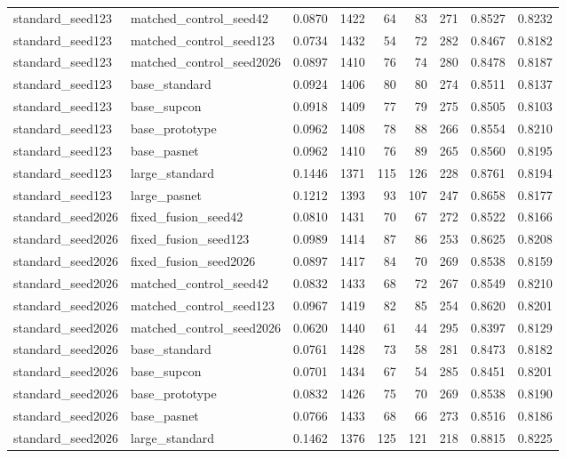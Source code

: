 \begin{tabular}{llrrrrrrr}
standard\_seed123 & matched\_control\_seed42 & 0.0870 & 1422 & 64 & 83 & 271 & 0.8527 & 0.8232 \\
standard\_seed123 & matched\_control\_seed123 & 0.0734 & 1432 & 54 & 72 & 282 & 0.8467 & 0.8182 \\
standard\_seed123 & matched\_control\_seed2026 & 0.0897 & 1410 & 76 & 74 & 280 & 0.8478 & 0.8187 \\
standard\_seed123 & base\_standard & 0.0924 & 1406 & 80 & 80 & 274 & 0.8511 & 0.8137 \\
standard\_seed123 & base\_supcon & 0.0918 & 1409 & 77 & 79 & 275 & 0.8505 & 0.8103 \\
standard\_seed123 & base\_prototype & 0.0962 & 1408 & 78 & 88 & 266 & 0.8554 & 0.8210 \\
standard\_seed123 & base\_pasnet & 0.0962 & 1410 & 76 & 89 & 265 & 0.8560 & 0.8195 \\
standard\_seed123 & large\_standard & 0.1446 & 1371 & 115 & 126 & 228 & 0.8761 & 0.8194 \\
standard\_seed123 & large\_pasnet & 0.1212 & 1393 & 93 & 107 & 247 & 0.8658 & 0.8177 \\
standard\_seed2026 & fixed\_fusion\_seed42 & 0.0810 & 1431 & 70 & 67 & 272 & 0.8522 & 0.8166 \\
standard\_seed2026 & fixed\_fusion\_seed123 & 0.0989 & 1414 & 87 & 86 & 253 & 0.8625 & 0.8208 \\
standard\_seed2026 & fixed\_fusion\_seed2026 & 0.0897 & 1417 & 84 & 70 & 269 & 0.8538 & 0.8159 \\
standard\_seed2026 & matched\_control\_seed42 & 0.0832 & 1433 & 68 & 72 & 267 & 0.8549 & 0.8210 \\
standard\_seed2026 & matched\_control\_seed123 & 0.0967 & 1419 & 82 & 85 & 254 & 0.8620 & 0.8201 \\
standard\_seed2026 & matched\_control\_seed2026 & 0.0620 & 1440 & 61 & 44 & 295 & 0.8397 & 0.8129 \\
standard\_seed2026 & base\_standard & 0.0761 & 1428 & 73 & 58 & 281 & 0.8473 & 0.8182 \\
standard\_seed2026 & base\_supcon & 0.0701 & 1434 & 67 & 54 & 285 & 0.8451 & 0.8201 \\
standard\_seed2026 & base\_prototype & 0.0832 & 1426 & 75 & 70 & 269 & 0.8538 & 0.8190 \\
standard\_seed2026 & base\_pasnet & 0.0766 & 1433 & 68 & 66 & 273 & 0.8516 & 0.8186 \\
standard\_seed2026 & large\_standard & 0.1462 & 1376 & 125 & 121 & 218 & 0.8815 & 0.8225 \\

\end{tabular}
